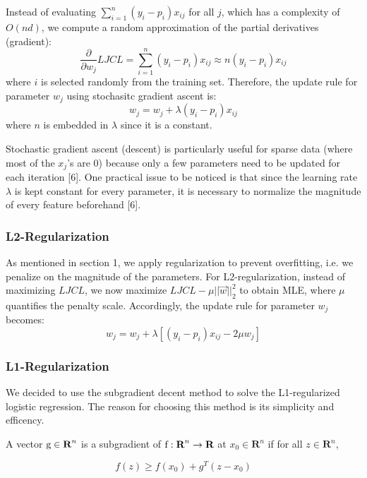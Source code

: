 \documentclass{article} %
\begin{document}
Instead of evaluating $\sum\limits_{i=1}^n(y_i-p_i)x_{ij}$ for all $j$, which has a complexity of
$O(nd)$, we compute a random approximation of the partial derivatives (gradient):
\begin{equation}
  \frac{\partial}{\partial w_j} LJCL = \sum\limits_{i=1}^n(y_i-p_i)x_{ij} \approx n(y_i-p_i)x_{ij}
\end{equation}
where $i$ is selected randomly from the training set. Therefore, the update rule for parameter $w_j$ using stochasitc gradient ascent is:
\begin{equation}
  w_j = w_j + \lambda (y_i-p_i)x_{ij}
\end{equation}
where $n$ is embedded in $\lambda$ since it is a constant.

Stochastic gradient ascent (descent) is particularly useful for sparse data (where most of the $x_j$'s are 0) because only a few parameters need to be updated for each iteration [6]. One practical issue to be noticed is that since the learning rate $\lambda$ is kept constant for every parameter, it is necessary to normalize the magnitude of every feature beforehand [6].

\subsubsection{L2-Regularization}

As mentioned in section 1, we apply regularization to prevent overfitting, i.e. we penalize on the magnitude of the parameters. For L2-regularization, instead of maximizing $LJCL$, we now maximize $LJCL - \mu ||\vec{w}||_2^2$ to obtain MLE, where $\mu$ quantifies the penalty scale. Accordingly, the update rule for parameter $w_j$ becomes:
\begin{equation}
  w_j = w_j + \lambda [(y_i-p_i)x_{ij} - 2\mu w_j]
\end{equation}


\subsubsection{L1-Regularization}
We decided to use the subgradient decent method to solve the L1-regularized logistic regression. The reason for choosing this method is its simplicity and efficency.

A vector $\textup{g} \in \textbf{R}^n$ is a subgradient of $\textup{f}:\textbf{R}^n \rightarrow \textbf{R}$ at $x_0 \in \textbf{R}^n$ if for all $z \in \textbf{R}^n$,

\begin{equation}
f(z) \ge f(x_0) + g^T(z-x_0)
\end{equation}
\end{document}
